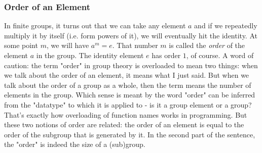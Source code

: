











\subsubsection{Order of an Element}
In finite groups, it turns out that we can take any element $a$ and if we repeatedly multiply it by itself (i.e. form powers of it), we will eventually hit the identity. At some point $m$, we will have $a^m = e$. That number $m$ is called the \emph{order} of the element $a$ in the group. The identity element $e$ has order $1$, of course. A word of caution: the term "order" in group theory is overloaded to mean two things: when we talk about the order of an element, it means what I just said. But when we talk about the order of a group as a whole, then the term means the number of elements in the group. Which sense is meant by the word "order" can be inferred from the "datatype" to which it is applied to - is it a group element or a group? That's exactly how overloading of function names works in programming. But these two notions of order are related: the order of an element is equal to the order of the subgroup that is generated by it. In the second part of the sentence, the "order" is indeed the size of a (sub)group.



